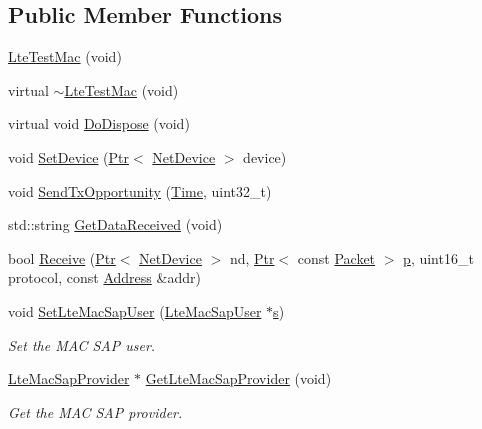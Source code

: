 \subsection*{Public Member Functions}
\begin{DoxyCompactItemize}
\item 
\hyperlink{classns3_1_1LteTestMac_a2a2191cf031ed74e109b1522cc4e06ea}{Lte\+Test\+Mac} (void)
\item 
virtual \hyperlink{classns3_1_1LteTestMac_af5ff57aa64b0d7a74a00f08643afea80}{$\sim$\+Lte\+Test\+Mac} (void)
\item 
virtual void \hyperlink{classns3_1_1LteTestMac_a25f46daed0cbb1eaff2de91de01d9080}{Do\+Dispose} (void)
\item 
void \hyperlink{classns3_1_1LteTestMac_ac5ab03df2036a914467c336dc51ca41b}{Set\+Device} (\hyperlink{classns3_1_1Ptr}{Ptr}$<$ \hyperlink{classns3_1_1NetDevice}{Net\+Device} $>$ device)
\item 
void \hyperlink{classns3_1_1LteTestMac_a3af5da64ba337869f4082118194f6641}{Send\+Tx\+Opportunity} (\hyperlink{classns3_1_1Time}{Time}, uint32\+\_\+t)
\item 
std\+::string \hyperlink{classns3_1_1LteTestMac_addac02f6d62857aa9c75acaa46e4b0c3}{Get\+Data\+Received} (void)
\item 
bool \hyperlink{classns3_1_1LteTestMac_ab81be5a4cbeeb73597f870e63171c3ab}{Receive} (\hyperlink{classns3_1_1Ptr}{Ptr}$<$ \hyperlink{classns3_1_1NetDevice}{Net\+Device} $>$ nd, \hyperlink{classns3_1_1Ptr}{Ptr}$<$ const \hyperlink{classns3_1_1Packet}{Packet} $>$ \hyperlink{lte__link__budget__x2__handover__measures_8m_ac9de518908a968428863f829398a4e62}{p}, uint16\+\_\+t protocol, const \hyperlink{classns3_1_1Address}{Address} \&addr)
\item 
void \hyperlink{classns3_1_1LteTestMac_a234317bfc20d9f149bfbd36546a50d4b}{Set\+Lte\+Mac\+Sap\+User} (\hyperlink{classns3_1_1LteMacSapUser}{Lte\+Mac\+Sap\+User} $\ast$\hyperlink{generate__test__data__lte__sinr_8m_ad83eeb3a142285d1243a08c6b7026df8}{s})
\begin{DoxyCompactList}\small\item\em Set the M\+AC S\+AP user. \end{DoxyCompactList}\item 
\hyperlink{classns3_1_1LteMacSapProvider}{Lte\+Mac\+Sap\+Provider} $\ast$ \hyperlink{classns3_1_1LteTestMac_aca0bc578effe20c77f51c7a39c8f089e}{Get\+Lte\+Mac\+Sap\+Provider} (void)
\begin{DoxyCompactList}\small\item\em Get the M\+AC S\+AP provider. \end{DoxyCompactList}\item 

\end{DoxyCompactItemize}
